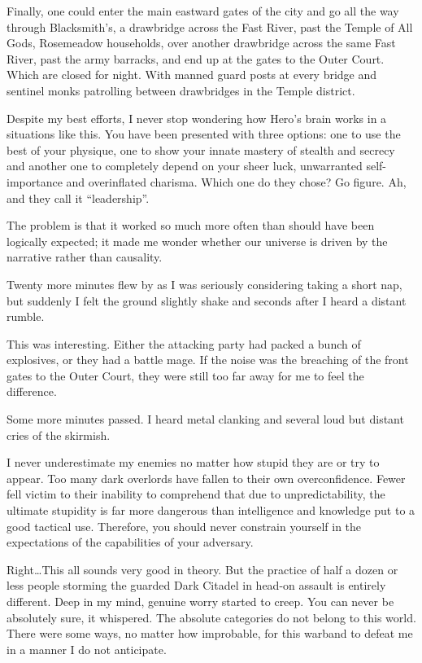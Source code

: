 Finally, one could enter the main eastward gates of the city and go all the way through Blacksmith’s, a drawbridge across the Fast River, past the Temple of All Gods, Rosemeadow households, over another drawbridge across the same Fast River, past the army barracks, and end up at the gates to the Outer Court. Which are closed for night. With manned guard posts at every bridge and sentinel monks patrolling between drawbridges in the Temple district.

Despite my best efforts, I never stop wondering how Hero’s brain works in a situations like this. You have been presented with three options: one to use the best of your physique, one to show your innate mastery of stealth and secrecy and another one to completely depend on your sheer luck, unwarranted self-importance and overinflated charisma. Which one do they chose? Go figure. Ah, and they call it “leadership”.

The problem is that it worked so much more often than should have been logically expected; it made me wonder whether our universe is driven by the narrative rather than causality.

Twenty more minutes flew by as I was seriously considering taking a short nap, but suddenly I felt the ground slightly shake and seconds after I heard a distant rumble.

This was interesting. Either the attacking party had packed a bunch of explosives, or they had a battle mage. If the noise was the breaching of the front gates to the Outer Court, they were still too far away for me to feel the difference.

Some more minutes passed. I heard metal clanking and several loud but distant cries of the skirmish.

I never underestimate my enemies no matter how stupid they are or try to appear. Too many dark overlords have fallen to their own overconfidence. Fewer fell victim to their inability to comprehend that due to unpredictability, the ultimate stupidity is far more dangerous than intelligence and knowledge put to a good tactical use. Therefore, you should never constrain yourself in the expectations of the capabilities of your adversary.

Right\dots This all sounds very good in theory. But the practice of half a dozen or less people storming the guarded Dark Citadel in head-on assault is entirely different. Deep in my mind, genuine worry started to creep. You can never be absolutely sure, it whispered. The absolute categories do not belong to this world. There were some ways, no matter how improbable, for this warband to defeat me in a manner I do not anticipate.

